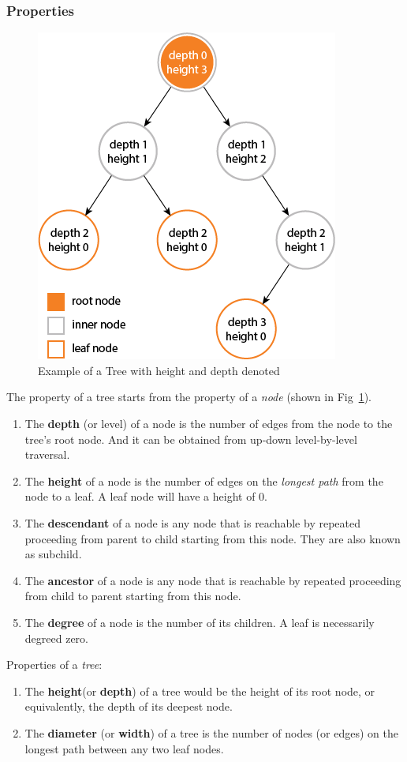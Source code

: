 \documentclass[data-structure.tex]{subfiles}
\begin{document}
\subsubsection{Properties}
\begin{figure}[h]
    \centering
    \includegraphics[width=0.6\columnwidth]{fig/tree_property.png}
    \caption{Example of a Tree with height and depth denoted}
    \label{fig:tree_property}
\end{figure}
The property of a tree starts from the property of a \textit{node} (shown in Fig~\ref{fig:tree_property}).
\begin{enumerate}
    \item The \textbf{depth} (or level) of a node is the number of edges from the node to the tree's root node. And it can be obtained from up-down level-by-level traversal.
    \item The \textbf{height} of a node is the number of edges on the \textit{longest path} from the node to a leaf. A leaf node will have a height of 0.
    \item The \textbf{descendant} of a node is any node that is reachable by repeated proceeding from parent to child starting from this node. They are also known as subchild.
    \item The \textbf{ancestor} of a node is any node that is reachable by repeated proceeding from child to parent starting from this node.
    \item The \textbf{degree} of a node is the number of its children. A leaf is necessarily degreed zero. 
\end{enumerate}

Properties of a \textit{tree}:
\begin{enumerate}
    \item The \textbf{height}(or \textbf{depth}) of a tree would be the height of its root node, or equivalently, the depth of its deepest node. 
    \item The \textbf{diameter} (or \textbf{width}) of a tree is the number of nodes (or edges) on the longest path between any two leaf nodes. 
\end{enumerate}
\end{document}
